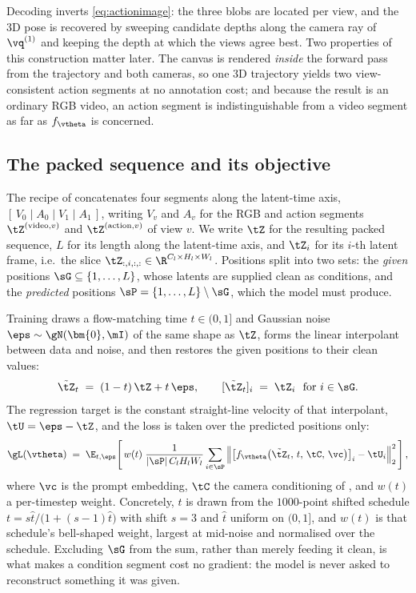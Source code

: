 \documentclass{article} %
\begin{document}
Decoding inverts \eqref{eq:actionimage}: the three blobs are located per view, and the 3D pose is
recovered by sweeping candidate depths along the camera ray of $\vq^{(1)}$ and keeping the depth
at which the views agree best. Two properties of this construction matter later. The canvas is
rendered \emph{inside} the forward pass from the trajectory and both cameras, so one 3D trajectory
yields two view-consistent action segments at no annotation cost; and because the result is an
ordinary RGB video, an action segment is indistinguishable from a video segment as far as
$f_{\vtheta}$ is concerned.

\subsection{The packed sequence and its objective}
\label{sec:objective}

The recipe of \citet{zhen2026action} concatenates four segments along the latent-time axis,
$[\,V_0 \mid A_0 \mid V_1 \mid A_1\,]$, writing $V_v$ and $A_v$ for the RGB and action segments
$\tZ^{(\mathrm{video},v)}$ and $\tZ^{(\mathrm{action},v)}$ of view $v$. We write $\tZ$ for the
resulting packed sequence, $L$ for its length along the latent-time axis, and $\tZ_i$ for its
$i$-th latent frame, i.e.\ the slice $\tZ_{:,i,:,:}\in\R^{C_l\times H_l\times W_l}$. Positions
split into two sets: the \emph{given} positions $\sG\subseteq\{1,\dots,L\}$, whose latents are
supplied clean as conditions, and the \emph{predicted} positions
$\sP=\{1,\dots,L\}\setminus\sG$, which the model must produce.

Training draws a flow-matching time $t\in(0,1]$ and Gaussian noise $\eps\sim\gN(\bm{0},\mI)$ of
the same shape as $\tZ$, forms the linear interpolant between data and noise, and then restores
the given positions to their clean values:
\begin{equation}
\tilde\tZ_t \;=\; (1-t)\,\tZ + t\,\eps,
\qquad
[\tilde\tZ_t]_i \;=\; \tZ_i \ \ \text{for } i\in\sG .
\label{eq:noise}
\end{equation}
The regression target is the constant straight-line velocity of that interpolant,
$\tU = \eps - \tZ$, and the loss is taken over the predicted positions only:
\begin{equation}
\gL(\vtheta) \;=\; \E_{t,\eps}\!\left[\,
w(t)\;\frac{1}{|\sP|\,C_l H_l W_l}
\sum_{i\in\sP}\Big\|\big[f_{\vtheta}\big(\tilde\tZ_t,\,t,\,\tC,\,\vc\big)\big]_i - \tU_i\Big\|_2^2
\,\right],
\label{eq:loss}
\end{equation}
where $\vc$ is the prompt embedding, $\tC$ the camera conditioning of , and
$w(t)$ a per-timestep weight. Concretely, $t$ is drawn from the $1000$-point shifted schedule
$t = s\hat t/\bigl(1+(s-1)\hat t\bigr)$ with shift $s=3$ and $\hat t$ uniform on $(0,1]$, and
$w(t)$ is that schedule's bell-shaped weight, largest at mid-noise and normalised over the
schedule. Excluding $\sG$ from the sum, rather than merely feeding it clean, is what makes a
condition segment cost no gradient: the model is never asked to reconstruct something it was
given.
\end{document}
